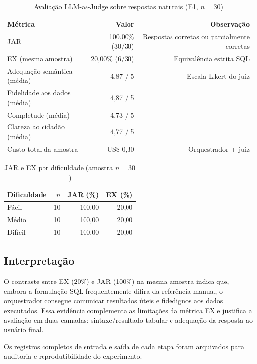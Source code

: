 \begin{table}[htbp]
\centering
\caption{Avaliação LLM-as-Judge sobre respostas naturais (E1, $n=30$)}
\label{tab:jar}
\begin{tabular}{lrr}
\toprule
\textbf{Métrica} & \textbf{Valor} & \textbf{Observação} \\
\midrule
JAR & 100,00\% (30/30) & Respostas corretas ou parcialmente corretas \\
EX (mesma amostra) & 20,00\% (6/30) & Equivalência estrita SQL \\
Adequação semântica (média) & 4,87 / 5 & Escala Likert do juiz \\
Fidelidade aos dados (média) & 4,87 / 5 & \\
Completude (média) & 4,73 / 5 & \\
Clareza ao cidadão (média) & 4,77 / 5 & \\
Custo total da amostra & US\$ 0,30 & Orquestrador + juiz \\
\bottomrule
\end{tabular}
\end{table}

\begin{table}[htbp]
\centering
\caption{JAR e EX por dificuldade (amostra $n=30$)}
\label{tab:jar-diff}
\begin{tabular}{lrrr}
\toprule
\textbf{Dificuldade} & \textbf{$n$} & \textbf{JAR (\%)} & \textbf{EX (\%)} \\
\midrule
Fácil & 10 & 100,00 & 20,00 \\
Médio & 10 & 100,00 & 20,00 \\
Difícil & 10 & 100,00 & 20,00 \\
\bottomrule
\end{tabular}
\end{table}

\subsection{Interpretação}

O contraste entre EX (20\%) e JAR (100\%) na mesma amostra indica que, embora a formulação SQL frequentemente difira da referência manual, o orquestrador consegue comunicar resultados úteis e fidedignos aos dados executados. Essa evidência complementa as limitações da métrica EX e justifica a avaliação em duas camadas: sintaxe/resultado tabular e adequação da resposta ao usuário final.

Os registros completos de entrada e saída de cada etapa foram arquivados para auditoria e reprodutibilidade do experimento.
